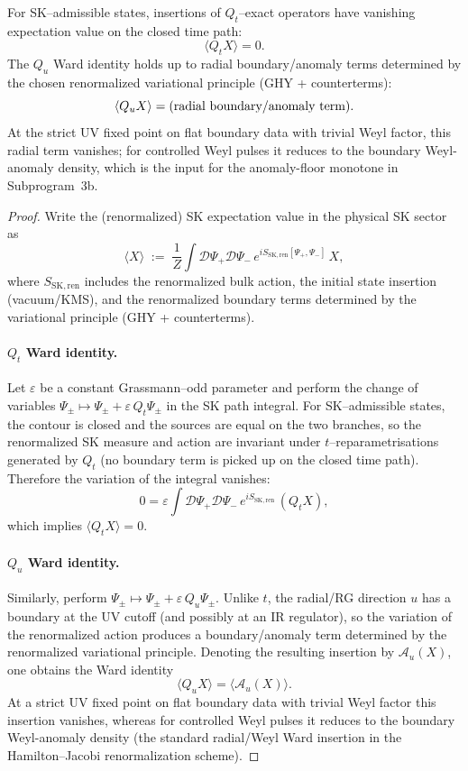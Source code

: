 \begin{proposition}
\label{prop:ward-identities}
For SK--admissible states, insertions of $Q_t$--exact operators have vanishing
expectation value on the closed time path:
\[
\langle Q_t X\rangle = 0.
\]
The $Q_u$ Ward identity holds up to radial boundary/anomaly terms determined by
the chosen renormalized variational principle (GHY + counterterms):
\[
\langle Q_u X\rangle = \textnormal{(radial boundary/anomaly term)}.
\]
At the strict UV fixed point on flat boundary data with trivial Weyl factor,
this radial term vanishes; for controlled Weyl pulses it reduces to the boundary
Weyl-anomaly density, which is the input for the anomaly-floor monotone in
Subprogram~3b.
\end{proposition}

\begin{proof}
Write the (renormalized) SK expectation value in the physical SK sector as
\[
\langle X\rangle
\;:=\;
\frac{1}{Z}\int \mathcal D\Psi_+\mathcal D\Psi_-\,e^{iS_{\mathrm{SK,ren}}[\Psi_+,\Psi_-]}\,X,
\]
where $S_{\mathrm{SK,ren}}$ includes the renormalized bulk action, the initial
state insertion (vacuum/KMS), and the renormalized boundary terms determined by
the variational principle (GHY + counterterms).

\paragraph{$Q_t$ Ward identity.}
Let $\varepsilon$ be a constant Grassmann--odd parameter and perform the change
of variables $\Psi_\pm\mapsto \Psi_\pm+\varepsilon\,Q_t\Psi_\pm$ in the SK path
integral.  For SK--admissible states, the contour is closed and the sources are
equal on the two branches, so the renormalized SK measure and action are
invariant under $t$--reparametrisations generated by $Q_t$ (no boundary term is
picked up on the closed time path).  Therefore the variation of the integral
vanishes:
\[
0
=
\varepsilon\int \mathcal D\Psi_+\mathcal D\Psi_-\,e^{iS_{\mathrm{SK,ren}}}\,(Q_t X),
\]
which implies $\langle Q_t X\rangle=0$.

\paragraph{$Q_u$ Ward identity.}
Similarly, perform $\Psi_\pm\mapsto \Psi_\pm+\varepsilon\,Q_u\Psi_\pm$.
Unlike $t$, the radial/RG direction $u$ has a boundary at the UV cutoff (and
possibly at an IR regulator), so the variation of the renormalized action
produces a boundary/anomaly term determined by the renormalized variational
principle.  Denoting the resulting insertion by $\mathcal A_u(X)$, one obtains
the Ward identity
\[
\langle Q_u X\rangle=\langle \mathcal A_u(X)\rangle.
\]
At a strict UV fixed point on flat boundary data with trivial Weyl factor this
insertion vanishes, whereas for controlled Weyl pulses it reduces to the
boundary Weyl-anomaly density (the standard radial/Weyl Ward insertion in the
Hamilton--Jacobi renormalization scheme).
\end{proof}

